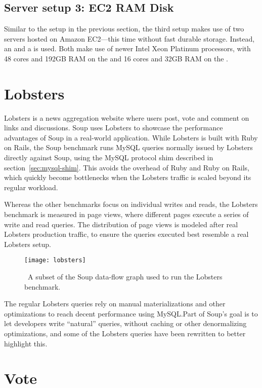 \subsection{Server setup 3: EC2 RAM Disk}\label{sec:server-3}

Similar to the setup in the previous section, the third setup makes use of two
servers hosted on Amazon EC2---this time without fast durable storage. Instead,
an  and a  is used. Both make use of newer
Intel Xeon Platinum processors, with 48 cores and 192GB RAM on the  and
16 cores and 32GB RAM on the .

\section{Lobsters}\label{sec:lobsters}

Lobsters is a news aggregation website where users post,
vote and comment on links and discussions. Soup uses Lobsters to showcase the
performance advantages of Soup in a real-world application. While Lobsters is
built with Ruby on Rails, the Soup benchmark runs MySQL queries normally issued
by Lobsters directly against Soup, using the MySQL protocol shim described in
section~\ref{sec:mysql-shim}. This avoids the overhead of Ruby and Ruby on
Rails, which quickly become bottlenecks when the Lobsters traffic is scaled
beyond its regular workload.

Whereas the other benchmarks focus on individual writes and reads, the Lobsters
benchmark is measured in page views, where different pages execute a series of
write and read queries. The distribution of page views is modeled after real
Lobsters production traffic, to ensure the queries executed best resemble a real
Lobsters setup.

\begin{figure}[H]
  \centering
  \texttt{[image: lobsters]}
  \caption{\
    A subset of the Soup data-flow graph used to run the Lobsters benchmark.
  }\label{fig:lobsters-graph}
\end{figure}

The regular Lobsters queries rely on manual materializations and other
optimizations to reach decent performance using MySQL.\@ Part of Soup's goal is
to let developers write ``natural'' queries, without caching or other
denormalizing optimizations, and some of the Lobsters queries have been
rewritten to better highlight this.

\section{Vote}\label{sec:vote}

